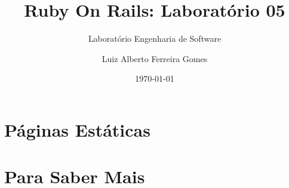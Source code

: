 \documentclass[t, 				             
			   final,
			   12pt, 				         
			   xcolor={usenames,dvipsnames}, 
			   table]{beamer}
\begin{document}
    \author{Luiz Alberto Ferreira Gomes}
    \title{Ruby On Rails: Laboratório 05}
    \subtitle{Laboratório Engenharia de Software}
    \date{\today}

	
	  	

  	\section{Páginas Estáticas}
		
		
		

  	\section{Para Saber Mais}
		
\end{document}
